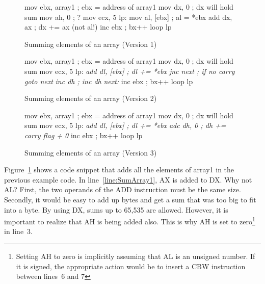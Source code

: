 \begin{figure}[t]
\begin{AsmCodeListing}[frame=single,commandchars=\\\{\}]
      mov    ebx, array1           ; ebx = address of array1
      mov    dx, 0                 ; dx will hold sum
      mov    ah, 0                 ; ?
      mov    ecx, 5
lp:
      mov    al, [ebx]             ; al = *ebx
      add    dx, ax                ; dx += ax (not al!) \label{line:SumArray1}
      inc    ebx                   ; bx++
      loop   lp
\end{AsmCodeListing}
\caption{Summing elements of an array (Version 1)\label{fig:SumArray1}}
\end{figure}

\begin{figure}[t]
\begin{AsmCodeListing}[frame=single,commandchars=\\\{\}]
      mov    ebx, array1           ; ebx = address of array1
      mov    dx, 0                 ; dx will hold sum
      mov    ecx, 5
lp:
\textit{      add    dl, [ebx]             ; dl += *ebx}
\textit{      jnc    next                  ; if no carry goto next}
\textit{      inc    dh                    ; inc dh}
\textit{next:}
      inc    ebx                   ; bx++
      loop   lp
\end{AsmCodeListing}
\caption{Summing elements of an array (Version 2)\label{fig:SumArray2}}
\end{figure}

\begin{figure}[t]
\begin{AsmCodeListing}[frame=single,commandchars=\\\{\}]
      mov    ebx, array1           ; ebx = address of array1
      mov    dx, 0                 ; dx will hold sum
      mov    ecx, 5
lp:
\textit{      add    dl, [ebx]             ; dl += *ebx}
\textit{      adc    dh, 0                 ; dh += carry flag + 0}
      inc    ebx                   ; bx++
      loop   lp
\end{AsmCodeListing}
\caption{Summing elements of an array (Version 3)\label{fig:SumArray3}}
\end{figure}

Figure~\ref{fig:SumArray1} shows a code snippet that adds all the
elements of {\code array1} in the previous example code. In
line~\ref{line:SumArray1}, AX is added to DX. Why not AL? First, the
two operands of the {\code ADD} instruction must be the same
size. Secondly, it would be easy to add up bytes and get a sum that
was too big to fit into a byte. By using DX, sums up to 65,535 are
allowed. However, it is important to realize that AH is being added
also.  This is why AH is set to zero\footnote{Setting AH to zero is
implicitly assuming that AL is an unsigned number. If it is signed,
the appropriate action would be to insert a {\code CBW} instruction
between lines~6 and 7} in line~3.

